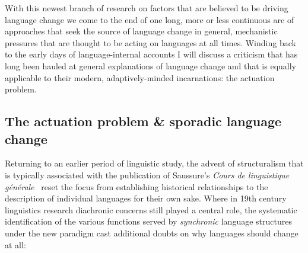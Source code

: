


With this newest branch of research on factors that are believed to be driving language change we come to the end of one long, more or less continuous arc of approaches that seek the source of language change in general, mechanistic pressures that are thought to be acting on languages at all times. Winding back to the early days of language-internal accounts I will discuss a criticism that has long been hauled at general explanations of language change and that is equally applicable to their modern, adaptively-minded incarnations: the actuation problem.

\subsection{The actuation problem \& sporadic language change}
\label{sec:actuationproblem}

Returning to an earlier period of linguistic study, the advent of structuralism that is typically associated with the publication of Saussure's \emph{Cours de linguistique générale}~\citeyearpar{Saussure1916} reset the focus from establishing historical relationships to the description of individual languages for their own sake. %
Where in 19th century linguistics research diachronic concerns still played a central role, the systematic identification of the various functions served by \emph{synchronic} language structures under the new paradigm cast additional doubts on why languages should change at all:

